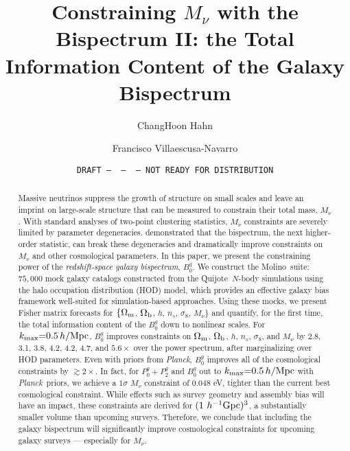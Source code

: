 \documentclass[12pt, letterpaper, preprint]{aastex63}
\newcommand{\Om}{\Omega_{\rm m}}
\newcommand{\Ob}{\Omega_{\rm b}}
\newcommand{\smnu}{M_\nu}
\newcommand{\sig}{\sigma_8}
\newcommand{\hmpc}{\,h/\mathrm{Mpc}}
\newcommand{\quij}{{\sc Quijote}}
\newcommand{\molino}{{\sc Molino}}
\newcommand{\planck}{{\em Planck}}
\newcommand{\kmax}{k_{\rm max}}
\newcommand{\Pgl}{P^g_0{+}P^g_2}
\newcommand{\Bg}{B^g_0}
\begin{document}

\title{Constraining $\smnu$ with the Bispectrum II: the Total Information Content of the Galaxy Bispectrum} 
\date{\texttt{DRAFT~---~\githash~---~\gitdate~---~NOT READY FOR DISTRIBUTION}}

\author{ChangHoon Hahn}

\author{Francisco Villaescusa-Navarro} 


\begin{abstract}
    Massive neutrinos suppress the growth of structure on small scales %
    and leave an imprint on large-scale structure that can be measured to
    constrain their total mass, $\smnu$. With standard analyses of two-point
    clustering statistics, $\smnu$ constraints are severely limited by parameter
    degeneracies. \cite{hahn2020} demonstrated that the bispectrum, the
    next higher-order statistic, can break these degeneracies and dramatically
    improve constraints on $\smnu$ and other cosmological parameters. In this
    paper, we present the constraining power of the {\em redshift-space galaxy 
    bispectrum}, $\Bg$. We construct the
    \molino~suite: $75,000$ mock galaxy
    catalogs constructed from the \quij~$N$-body simulations using the halo occupation distribution (HOD) model,
    which provides an effective galaxy bias framework well-suited for simulation-based
    approaches. Using these mocks, we present Fisher matrix forecasts for 
    $\{\Om$, $\Ob$, $h$, $n_s$, $\sig$, $\smnu\}$ and
    quantify, for the first time, the total information content of the $\Bg$
    down to nonlinear scales. For $\kmax{=}0.5\hmpc$, $\Bg$ improves constraints 
    on $\Om$, $\Ob$, $h$, $n_s$, $\sig$, and $\smnu$ by 2.8, 3.1, 3.8, 4.2,
    4.2, 4.7, and $5.6{\times}$ over the power spectrum, after marginalizing
    over HOD parameters. Even with priors from \planck, $\Bg$ improves all of 
    the cosmological constraints by $\gtrsim 2\times$. In fact, for $\Pgl$ and
    $\Bg$ out to $\kmax{=}0.5\hmpc$ with \planck~priors, we achieve a 
    $1\sigma$ $\smnu$ constraint of 0.048 eV, tighter than the current best 
    cosmological constraint. While effects such as survey geometry and assembly 
    bias will have an impact, these 
    constraints are derived for $(1~h^{-1}{\rm Gpc})^3$, a substantially
    smaller volume than upcoming surveys. Therefore, we conclude that including
    the galaxy bispectrum will significantly improve cosmological constraints
    for upcoming galaxy surveys --- especially for $\smnu$.
\end{abstract}
\end{document}
